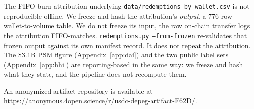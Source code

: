 The FIFO burn attribution underlying \texttt{data/redemptions\_by\_wallet.csv} is not
reproducible offline. We freeze and hash the attribution's \emph{output}, a 776-row
wallet-to-volume table. We do not freeze its input, the raw on-chain transfer logs the
attribution FIFO-matches. \texttt{redemptions.py --from-frozen} re-validates that frozen
output against its own manifest record. It does not repeat the attribution. The \$3.1B
PSM figure (Appendix~\ref{app:dai}) and the two public label sets
(Appendix~\ref{app:hhi}) are reporting-based in the same way: we freeze and hash what
they state, and the pipeline does not recompute them.

\begin{table}[t]
\centering
\caption{Claim map, first half. Each reported quantity, the results file it regenerates
from, and the key within that file. Both the file and the key are checked against the
results files themselves, and the section column is a cross-reference rather than a
typed number, so neither can drift.}
\label{tab:claimmap}
\scriptsize
\checkwidth{\scriptsize}

\end{table}

\begin{table}[t]
\centering
\caption{Claim map, second half. Columns as in Table~\ref{tab:claimmap}.}
\label{tab:claimmapb}
\scriptsize
\checkwidth{\scriptsize}

\end{table}

An anonymized artifact repository is available at
\url{https://anonymous.4open.science/r/usdc-depeg-artifact-F62D/}.

